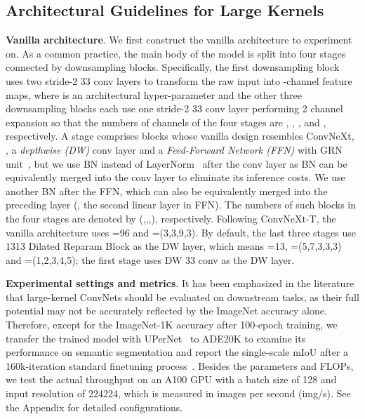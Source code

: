 \documentclass[10pt,twocolumn,letterpaper]{article}
\begin{document}
\subsection{Architectural Guidelines for Large Kernels}\label{sec-guidelines}

\textbf{Vanilla architecture}. We first construct the vanilla architecture to experiment on. As a common practice, the main body of the model is split into four stages connected by downsampling blocks. Specifically, the first downsampling block uses two stride-2 33 conv layers to transform the raw input into -channel feature maps, where  is an architectural hyper-parameter and the other three downsampling blocks each use one stride-2 33 conv layer performing 2 channel expansion so that the numbers of channels of the four stages are , , , and , respectively. A stage comprises blocks whose vanilla design resembles ConvNeXt, \ie, a \emph{depthwise (DW)} conv layer and a \emph{Feed-Forward Network (FFN)} with GRN unit~\cite{woo2023convnext}, but we use BN instead of LayerNorm~\cite{ba2016layer} after the conv layer as BN can be equivalently merged into the conv layer to eliminate its inference costs. We use another BN after the FFN, which can also be equivalently merged into the preceding layer (\ie, the second linear layer in FFN). The numbers of such blocks in the four stages are denoted by  (,,,), respectively. Following ConvNeXt-T, the vanilla architecture uses =96 and =(3,3,9,3). By default, the last three stages use 1313 Dilated Reparam Block as the DW layer, which means =13, =(5,7,3,3,3) and =(1,2,3,4,5); the first stage uses DW 33 conv as the DW layer.


\noindent\textbf{Experimental settings and metrics}. It has been emphasized in the literature~\cite{ding2022scaling} that large-kernel ConvNets should be evaluated on downstream tasks, as their full potential may not be accurately reflected by the ImageNet accuracy alone. Therefore, except for the ImageNet-1K accuracy after 100-epoch training, we transfer the trained model with UPerNet~\cite{xiao2018unified} to ADE20K to examine its performance on semantic segmentation and report the single-scale mIoU after a 160k-iteration standard finetuning process~\cite{mmseg2020}. Besides the parameters and FLOPs, we test the actual throughput on an A100 GPU with a batch size of 128 and input resolution of 224224, which is measured in images per second (img/s). See the Appendix for detailed configurations.
\end{document}
